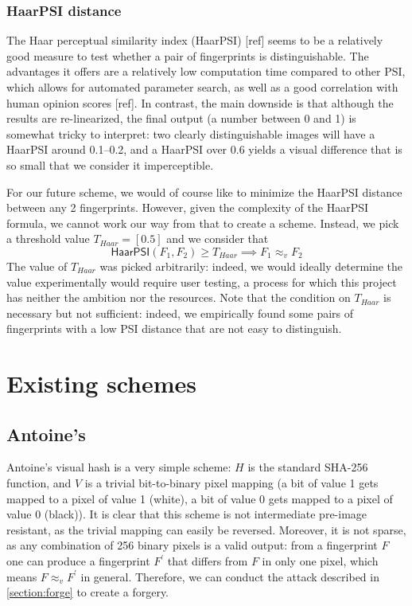 \documentclass{article}
\newcommand{\vis}{\approx_v}
\begin{document}
\subsubsection{HaarPSI distance}
The Haar perceptual similarity index (HaarPSI) [ref] seems to be a relatively good measure to test whether a pair of fingerprints is distinguishable. The advantages it offers are a relatively low computation time compared to other PSI, which allows for automated parameter search, as well as a good correlation with human opinion scores [ref]. In contrast, the main downside is that although the results are re-linearized, the final output (a number between 0 and 1) is somewhat tricky to interpret: two clearly distinguishable images will have a HaarPSI around 0.1--0.2, and a HaarPSI over 0.6 yields a visual difference that is so small that we consider it imperceptible.

For our future scheme, we would of course like to minimize the HaarPSI distance between any 2 fingerprints. However, given the complexity of the HaarPSI formula, we cannot work our way from that to create a scheme. Instead, we pick a threshold value $T_{Haar} = [0.5]$ and we consider that $$\mathsf{HaarPSI}(F_1,F_2) \geq T_{Haar} \implies F_1 \vis F_2$$
The value of $T_{Haar}$ was picked arbitrarily: indeed, we would ideally determine the value experimentally would require user testing, a process for which this project has neither the ambition nor the resources. Note that the condition on $T_{Haar}$ is necessary but not sufficient: indeed, we empirically found some pairs of fingerprints with a low PSI distance that are not easy to distinguish.


\section{Existing schemes}
\subsection{Antoine's}
Antoine's visual hash is a very simple scheme: $H$ is the standard SHA-256 function, and $V$ is a trivial bit-to-binary pixel mapping (a bit of value 1 gets mapped to a pixel of value 1 (white), a bit of value 0 gets mapped to a pixel of value 0 (black)). It is clear that this scheme is not intermediate pre-image resistant, as the trivial mapping can easily be reversed. Moreover, it is not sparse, as any combination of 256 binary pixels is a valid output: from a fingerprint $F$ one can produce a fingerprint $F^\prime$ that differs from $F$ in only one pixel, which means $F \vis F^\prime$ in general. Therefore, we can conduct the attack described in \cref{section:forge} to create a forgery.
\end{document}
